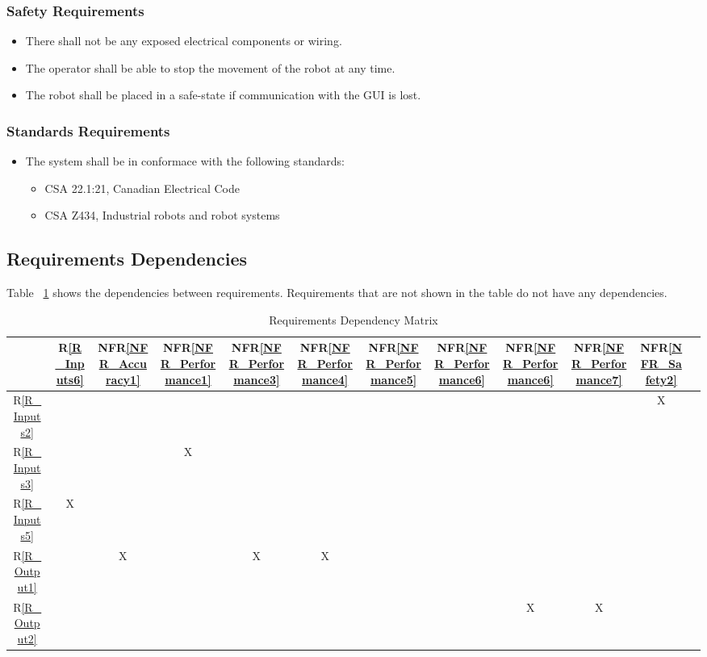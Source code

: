 \documentclass[12pt]{article}
\newcommand{\rref}[1]{R\ref{#1}}
\newcounter{nfrnum} %
\newcommand{\nfrref}[1]{NFR\ref{#1}}
\begin{document}
\subsubsection{Safety Requirements}
\noindent \begin{itemize}
\item[NFR\refstepcounter{nfrnum}\thenfrnum \label{NFR_Safety1}:] There shall not be any exposed electrical components or wiring.
\item[NFR\refstepcounter{nfrnum}\thenfrnum \label{NFR_Safety2}:] The operator shall be able to stop the movement of the robot at any time.
\item[NFR\refstepcounter{nfrnum}\thenfrnum \label{NFR_Safety3}:] The robot shall be placed in a safe-state if communication with the GUI is lost.
\end{itemize}

\subsubsection{Standards Requirements}
\noindent \begin{itemize}
\item[NFR\refstepcounter{nfrnum}\thenfrnum \label{NFR_Standard1}:] The system shall be in conformace with the following standards:
\begin{itemize}
\item CSA 22.1:21, Canadian Electrical Code \cite{CSA1}
\item CSA Z434, Industrial robots and robot systems \cite{CSA2}
\end{itemize}
\end{itemize}

\subsection{Requirements Dependencies}

Table ~\ref{Table:A_trace} shows the dependencies between requirements. Requirements that are not shown in the table do not have any dependencies.

\begin{table}[H]
\centering
\caption{Requirements Dependency Matrix}
\begin{tabular}{|c|c|c|c|c|c|c|c|c|c|c|c|}
\hline
	& \rref{R_Inputs6}& \nfrref{NFR_Accuracy1}& \nfrref{NFR_Performance1}& \nfrref{NFR_Performance3}& \nfrref{NFR_Performance4}& \nfrref{NFR_Performance5}& \nfrref{NFR_Performance6}& \nfrref{NFR_Performance6}& \nfrref{NFR_Performance7}& \nfrref{NFR_Safety2} \\
\hline
\rref{R_Inputs2}      & & & & & & & & & &X\\ 
\hline
\rref{R_Inputs3}      & & &X & & & & & & &\\ 
\hline
\rref{R_Inputs5}      &X & & & & & & & & &\\  
\hline
\rref{R_Output1}      & &X & &X &X & & & & &\\ 
\hline
\rref{R_Output2}      & & & & & & & &X &X &\\ 
\hline
\end{tabular}

\label{Table:A_trace}
\end{table}
\end{document}
